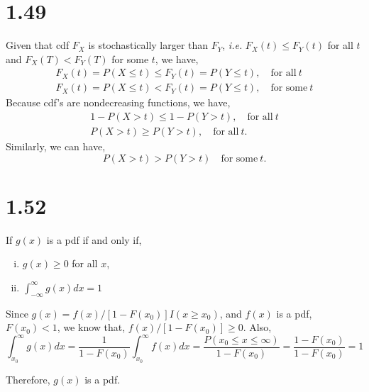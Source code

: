 \documentclass[letter]{article}
\begin{document}
    \section*{1.49}
    Given that cdf $F_X$ is stochastically larger than $F_Y$, \emph{i.e.}  
    $F_X(t) \leq F_Y(t)$ for all $t$ and $F_X(T) < F_Y(T)$ for some $t$,
    we have,
    \begin{eqnarray*}
    F_X(t) = P(X \leq t) \leq F_Y(t) = P(Y \leq t), \quad \text{for all}~t\\
    F_X(t) = P(X \leq t) < F_Y(t) = P(Y \leq t), \quad \text{for some}~t
    \end{eqnarray*}
    Because cdf's are nondecreasing functions, we have,
    \begin{eqnarray*}
    1-P(X > t) \leq 1-P(Y > t), \quad \text{for all}~t\\
    P(X > t) \geq P(Y > t), \quad \text{for all}~t.
    \end{eqnarray*}
    Similarly, we can have,
    \[
    P(X>t) > P(Y>t) \quad \text{for some}~t.
    \]

    \section*{1.52}
    If $g(x)$ is a pdf if and only if,
    \begin{enumerate}[(i)]
        \item $g(x) \geq 0$ for all $x$,
        \item $\int_{-\infty}^{\infty} g(x) dx = 1$
    \end{enumerate}
    Since $g(x) = f(x)/[1-F(x_0)] I(x \geq x_0)$, and $f(x)$ is a pdf, 
    $F(x_0) < 1$, we know that, $f(x)/[1-F(x_0)] \geq 0$.
    Also,
    \[
    \int_{x_0}^\infty g(x)dx = \frac{1}{1-F(x_0)} \int_{x_0}^\infty f(x)dx
    = \frac{P(x_0 \leq x \leq \infty)}{1-F(x_0)} = \frac{1-F(x_0)}{1-F(x_0)} =
    1
    \]

    Therefore, $g(x)$ is a pdf.
\end{document}
